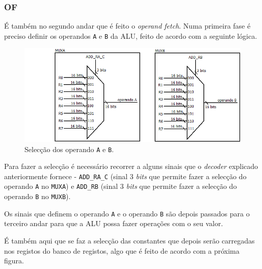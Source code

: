 \documentclass[11pt]{article}
\numberwithin{equation}{section}
\begin{document}


\subsubsection{OF}

É também no segundo andar que é feito o \textit{operand fetch}. Numa primeira fase é preciso definir os operandos \texttt{A} e \texttt{B} da ALU, feito de acordo com a seguinte lógica.

\begin{figure}[H]
	\centering
	\includegraphics[keepaspectratio=true, scale=0.35]{imagens/OF1}
	\caption{Selecção dos operando \texttt{A} e \texttt{B}.}
	\vspace{-0.8em}
\end{figure}

Para fazer a selecção é necessário recorrer a alguns sinais que o \textit{decoder} explicado anteriormente fornece - \texttt{ADD\_RA\_C} (sinal 3 \textit{bits} que permite fazer a selecção do operando \texttt{A} no \texttt{MUXA}) e \texttt{ADD\_RB} (sinal 3 \textit{bits} que permite fazer a selecção do operando \texttt{B} no \texttt{MUXB}). 


Os sinais que definem o operando \texttt{A} e o operando \texttt{B} são depois passados para o terceiro andar para que a ALU possa fazer operações com o seu valor.

É também aqui que se faz a selecção das constantes que depois serão carregadas nos registos do banco de registos, algo que é feito de acordo com a próxima figura.
\end{document}
